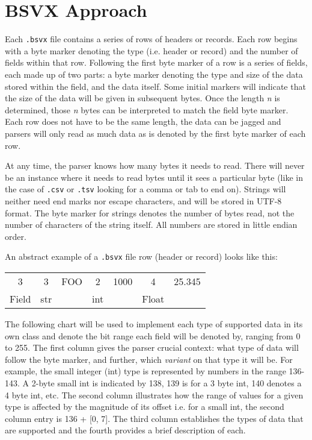 \documentclass[10pt]{article}
\begin{document}
\section*{BSVX Approach}

Each \texttt{.bsvx} file contains a series of rows of headers or records.
Each row begins with a byte marker denoting the type (i.e. header or record) and the number of fields within that row.
Following the first byte marker of a row is a series of fields, each made up of two parts: a byte marker denoting the type and size of the data stored within the field, and the data itself.
Some initial markers will indicate that the size of the data will be given in subsequent bytes.
Once the length \textit{n} is determined, those \textit{n} bytes can be interpreted to match the field byte marker.
Each row does not have to be the same length, the data can be jagged and parsers will only read as much data as is denoted by the first byte marker of each row. 

\indent{}
At any time, the parser knows how many bytes it needs to read.
There will never be an instance where it needs to read bytes until it sees a particular byte (like in the case of \texttt{.csv} or \texttt{.tsv} looking for a comma or tab to end on).
Strings will neither need end marks nor escape characters, and will be stored in UTF-8 format.
The byte marker for strings denotes the number of bytes read, not the number of characters of the string itself.
All numbers are stored in little endian order.

\indent{}
An abstract example of a \texttt{.bsvx} file row (header or record) looks like this:

\begin{table}[h!]
\centering
\begin{tabular}{|c|c|c|c|c|c|c|}
\hline
3 & 3 & FOO & 2 & 1000 & 4 & 25.345 \\
Field & str &  & int &  & Float &  \\ \hline
\end{tabular}
\end{table}

\indent{}
The following chart will be used to implement each type of supported data in its own class and denote the bit range each field will be denoted by, ranging from 0 to 255.
The first column gives the parser crucial context: what type of data will follow the byte marker, and further, which \textit{variant} on that type it will be.
For example, the small integer (int) type is represented by numbers in the range 136-143. 
A 2-byte small int is indicated by 138, 139 is for a 3 byte int, 140 denotes a 4 byte int, etc.
The second column illustrates how the range of values for a given type is affected by the magnitude of its offset i.e. for a small int, the second column entry is 136 + [0, 7].
The third column establishes the types of data that are supported and the fourth provides a brief description of each.
\end{document}
